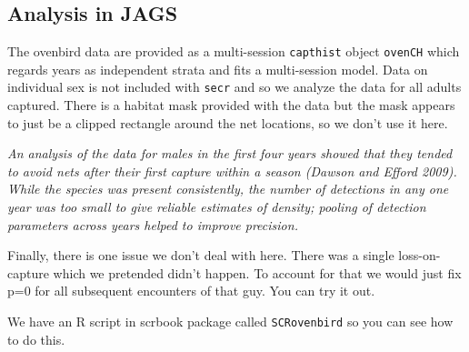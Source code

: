 \subsection{Analysis in JAGS}

The ovenbird data are provided as a multi-session \mbox{\tt capthist}
object \mbox{\tt ovenCH} which regards years as independent strata and
fits a multi-session model. Data on individual sex is not included
with \mbox{\tt secr} and so we analyze the data for all adults captured. 
There is a habitat mask provided with the data but the mask appears to
just be a clipped rectangle around the net locations, so we don't use
it here. 

{\it
  An analysis of the data for males in the first four years showed
  that they tended to avoid nets after their first capture within a
  season (Dawson and Efford 2009). While the species was present
  consistently, the number of detections in any one year was too small
  to give reliable estimates of density; pooling of detection
  parameters across years helped to improve precision.  
}

Finally, there is one issue we don't deal with here. There was a single
loss-on-capture which we pretended didn't happen. To account for that
we would just fix p=0 for all subsequent encounters of that guy. You
can try it out.

We have an R script in scrbook package called \mbox{\tt SCRovenbird}
so you can see how to do this. 


